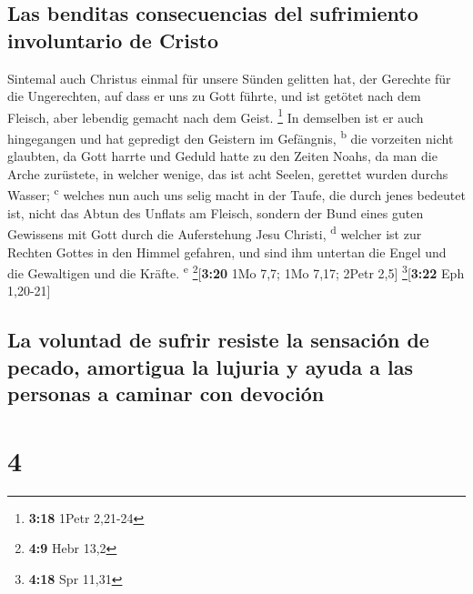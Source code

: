 \hypertarget{las-benditas-consecuencias-del-sufrimiento-involuntario-de-cristo}{%
\subsection{Las benditas consecuencias del sufrimiento involuntario de
Cristo}\label{las-benditas-consecuencias-del-sufrimiento-involuntario-de-cristo}}

 Sintemal auch Christus einmal für unsere Sünden gelitten
hat, der Gerechte für die Ungerechten, auf dass er uns zu Gott führte,
und ist getötet nach dem Fleisch, aber lebendig gemacht nach dem Geist.
\footnote{\textbf{3:18} 1Petr 2,21-24}  In demselben ist
er auch hingegangen und hat gepredigt den Geistern im Gefängnis,
\textsuperscript{b}  die vorzeiten nicht glaubten, da
Gott harrte und Geduld hatte zu den Zeiten Noahs, da man die Arche
zurüstete, in welcher wenige, das ist acht Seelen, gerettet wurden
durchs Wasser; \textsuperscript{c}  welches nun auch uns
selig macht in der Taufe, die durch jenes bedeutet ist, nicht das Abtun
des Unflats am Fleisch, sondern der Bund eines guten Gewissens mit Gott
durch die Auferstehung Jesu Christi, \textsuperscript{d} 
welcher ist zur Rechten Gottes in den Himmel gefahren, und sind ihm
untertan die Engel und die Gewaltigen und die Kräfte.
\textsuperscript{e} \footnote{\textbf{4:9} Hebr 13,2}{[}\textbf{3:20}
1Mo 7,7; 1Mo 7,17; 2Petr 2,5{]} \footnote{\textbf{4:18} Spr 11,31}{[}\textbf{3:22}
Eph 1,20-21{]}

\hypertarget{la-voluntad-de-sufrir-resiste-la-sensaciuxf3n-de-pecado-amortigua-la-lujuria-y-ayuda-a-las-personas-a-caminar-con-devociuxf3n}{%
\subsection{La voluntad de sufrir resiste la sensación de pecado,
amortigua la lujuria y ayuda a las personas a caminar con
devoción}\label{la-voluntad-de-sufrir-resiste-la-sensaciuxf3n-de-pecado-amortigua-la-lujuria-y-ayuda-a-las-personas-a-caminar-con-devociuxf3n}}

\hypertarget{section-3}{%
\section{4}\label{section-3}}


